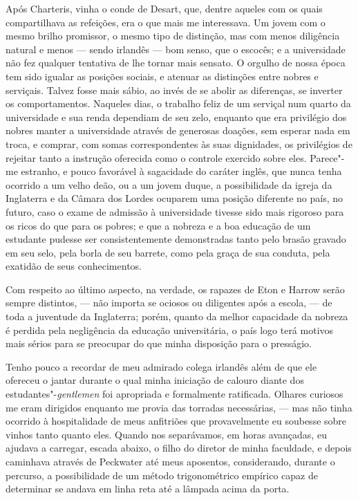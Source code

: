 Após Charteris, vinha o conde de Desart, que, dentre aqueles com os
quais compartilhava as refeições, era o que mais me interessava. Um
jovem com o mesmo brilho promissor, o mesmo tipo de distinção, mas com
menos diligência natural e menos --- sendo irlandês --- bom senso, que o
escocês; e a universidade não fez qualquer tentativa de lhe tornar mais
sensato. O orgulho de nossa época tem sido igualar as posições sociais,
e atenuar as distinções entre nobres e serviçais. Talvez fosse mais
sábio, ao invés de se abolir as diferenças, se inverter os
comportamentos. Naqueles dias, o trabalho feliz de um serviçal num
quarto da universidade e sua renda dependiam de seu zelo, enquanto que
era privilégio dos nobres manter a universidade através de generosas
doações, sem esperar nada em troca, e comprar, com somas correspondentes
às suas dignidades, os privilégios de rejeitar tanto a instrução
oferecida como o controle exercido sobre eles. Parece"-me estranho, e
pouco favorável à sagacidade do caráter inglês, que nunca tenha ocorrido
a um velho deão, ou a um jovem duque, a possibilidade da igreja da
Inglaterra e da Câmara dos Lordes ocuparem uma posição diferente no
país, no futuro, caso o exame de admissão à universidade tivesse sido
mais rigoroso para os ricos do que para os pobres; e que a nobreza e a
boa educação de um estudante pudesse ser consistentemente demonstradas
tanto pelo brasão gravado em seu selo, pela borla de seu barrete, como
pela graça de sua conduta, pela exatidão de seus conhecimentos.

Com respeito ao último aspecto, na verdade, os rapazes de Eton e Harrow
serão sempre distintos, --- não importa se ociosos ou diligentes após a
escola, --- de toda a juventude da Inglaterra; porém, quanto da melhor
capacidade da nobreza é perdida pela negligência da educação
universitária, o país logo terá motivos mais sérios para se preocupar do
que minha disposição para o presságio.

Tenho pouco a recordar de meu admirado colega irlandês além de que ele
ofereceu o jantar durante o qual minha iniciação de calouro diante dos
estudantes"-\textit{gentlemen} foi apropriada e formalmente ratificada.
Olhares curiosos me eram dirigidos enquanto me provia das torradas
necessárias, --- mas não tinha ocorrido à hospitalidade de meus
anfitriões que provavelmente eu soubesse sobre vinhos tanto quanto eles.
Quando nos separávamos, em horas avançadas, eu ajudava a carregar,
escada abaixo, o filho do diretor de minha faculdade, e depois caminhava
através de Peckwater até meus aposentos, considerando, durante o
percurso, a possibilidade de um método trigonométrico empírico capaz de
determinar se andava em linha reta até a lâmpada acima da porta.

